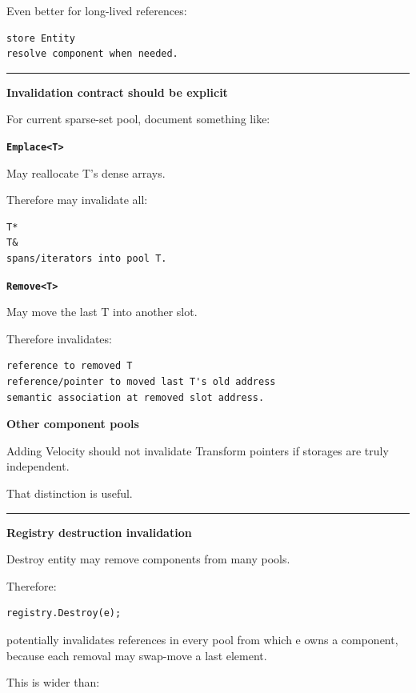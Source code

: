 Even better for long-lived references:

\begin{verbatim}
store Entity
resolve component when needed.
\end{verbatim}

\begin{center}\rule{0.5\linewidth}{0.5pt}\end{center}

\textbf{Invalidation contract should be explicit}

For current sparse-set pool, document something like:

\textbf{\texttt{Emplace\textless{}T\textgreater{}}}

May reallocate T's dense arrays.

Therefore may invalidate all:

\begin{verbatim}
T*
T&
spans/iterators into pool T.
\end{verbatim}

\textbf{\texttt{Remove\textless{}T\textgreater{}}}

May move the last T into another slot.

Therefore invalidates:

\begin{verbatim}
reference to removed T
reference/pointer to moved last T's old address
semantic association at removed slot address.
\end{verbatim}

\textbf{Other component pools}

Adding Velocity should not invalidate Transform pointers if storages are truly independent.

That distinction is useful.

\begin{center}\rule{0.5\linewidth}{0.5pt}\end{center}

\textbf{Registry destruction invalidation}

Destroy entity may remove components from many pools.

Therefore:

\begin{verbatim}
registry.Destroy(e);
\end{verbatim}

potentially invalidates references in every pool from which e owns a component, because each removal may swap-move a last element.

This is wider than:

